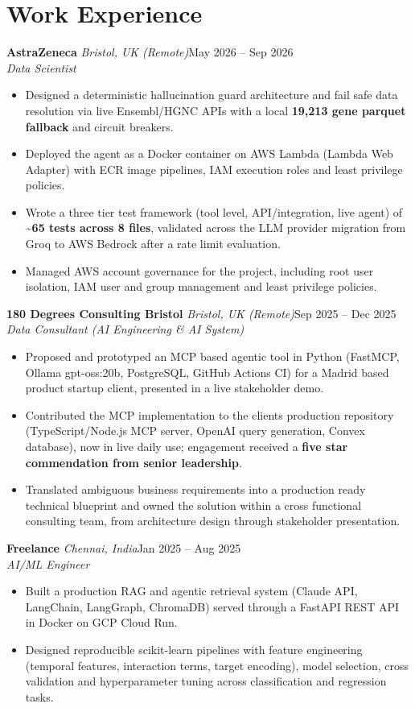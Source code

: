 \documentclass[a4paper,11pt]{article}
\newcommand{\role}[4]{%
  \textbf{#1}{\color{muted}\,\textperiodcentered\,\textit{#2}}\hfill{\color{muted}#3}\\
  \textit{#4}\par}
\newcommand{\gap}{\vspace{5pt}}
\newcommand{\num}[1]{\textbf{#1}}   %
\begin{document}
\section{Work Experience}
\role{AstraZeneca}{Bristol, UK (Remote)}{May 2026 – Sep 2026}{Data Scientist}
\begin{itemize}
  \item Designed a deterministic hallucination guard architecture and fail safe data resolution via live Ensembl/HGNC APIs with a local \num{19,213 gene parquet fallback} and circuit breakers.
  \item Deployed the agent as a Docker container on AWS Lambda (Lambda Web Adapter) with ECR image pipelines, IAM execution roles and least privilege policies.
  \item Wrote a three tier test framework (tool level, API/integration, live agent) of \num{\textasciitilde{}65 tests across 8 files}, validated across the LLM provider migration from Groq to AWS Bedrock after a rate limit evaluation.
  \item Managed AWS account governance for the project, including root user isolation, IAM user and group management and least privilege policies.
\end{itemize}
\gap
{}
\role{180 Degrees Consulting Bristol}{Bristol, UK (Remote)}{Sep 2025 – Dec 2025}{Data Consultant (AI Engineering \& AI System)}
\begin{itemize}
  \item Proposed and prototyped an MCP based agentic tool in Python (FastMCP, Ollama gpt-oss:20b, PostgreSQL, GitHub Actions CI) for a Madrid based product startup client, presented in a live stakeholder demo.
  \item Contributed the MCP implementation to the client\textquotesingle{}s production repository (TypeScript/Node.js MCP server, OpenAI query generation, Convex database), now in live daily use; engagement received a \num{five star commendation from senior leadership}.
  \item Translated ambiguous business requirements into a production ready technical blueprint and owned the solution within a cross functional consulting team, from architecture design through stakeholder presentation.
\end{itemize}
\gap
{}
\role{Freelance}{Chennai, India}{Jan 2025 – Aug 2025}{AI/ML Engineer}
\begin{itemize}
  \item Built a production RAG and agentic retrieval system (Claude API, LangChain, LangGraph, ChromaDB) served through a FastAPI REST API in Docker on GCP Cloud Run.
  \item Designed reproducible scikit-learn pipelines with feature engineering (temporal features, interaction terms, target encoding), model selection, cross validation and hyperparameter tuning across classification and regression tasks.
\end{itemize}
\end{document}
